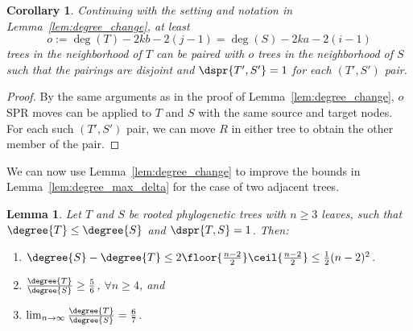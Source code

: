 \documentclass{amsart}
\newtheorem{lemma}[theorem]{Lemma}
\newtheorem{corollary}[theorem]{Corollary}
\begin{document}
\begin{corollary}
\label{cor:paired_neighbors}
Continuing with the setting and notation in Lemma~\ref{lem:degree_change}, at least
$$o := \deg(T) - 2kb - 2(j-1) = \deg(S) - 2ka - 2(i-1)$$
trees in the neighborhood of $T$ can be paired with $o$ trees in the neighborhood of $S$ such that the pairings are disjoint and $\dspr{T',S'} = 1$ for each $(T',S')$ pair.
\end{corollary}
\begin{proof}
By the same arguments as in the proof of Lemma~\ref{lem:degree_change}, $o$ SPR moves can be applied to $T$ and $S$ with the same source and target nodes.
For each such $(T',S')$ pair, we can move $R$ in either tree to obtain the other member of the pair.
\end{proof}

We can now use Lemma~\ref{lem:degree_change} to improve the bounds in Lemma~\ref{lem:degree_max_delta} for the case of two adjacent trees.
\begin{lemma}
	\label{lem:degree_max_delta_adjacent}
	Let $T$ and $S$ be rooted phylogenetic trees with $n \ge 3$ leaves, such that $\degree{T} \le \degree{S}$ and $\dspr{T,S} = 1$.
	Then:
	\begin{enumerate}
		\item $\degree{S} - \degree{T} \le 2\floor{\frac{n-2}{2}}\ceil{\frac{n-2}{2}} \le \frac{1}{2} (n-2)^2 $.
		\item $\frac{\degree{T}}{\degree{S}} \ge \frac{5}{6}$, $\forall n \ge 4$, and
		\item $\lim_{n\rightarrow\infty}\frac{\degree{T}}{\degree{S}} =  \frac{6}{7}$.
	\end{enumerate}
\end{lemma}
\end{document}
